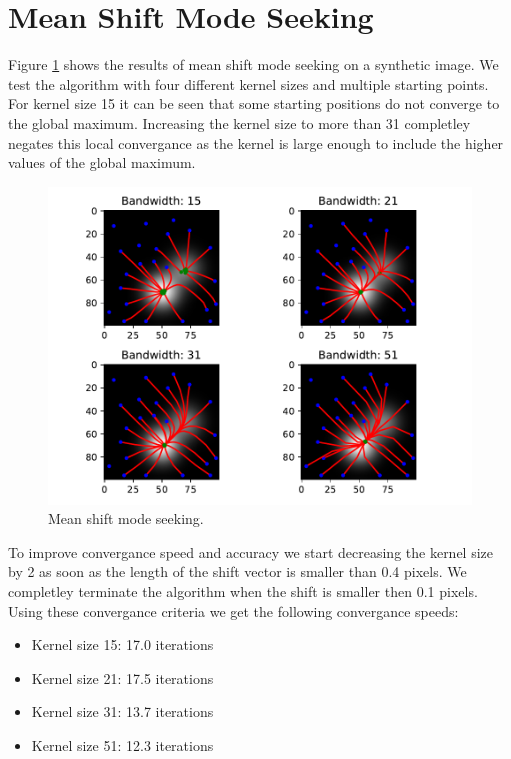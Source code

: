 \documentclass[9pt]{IEEEtran}
\begin{document}
\section{Mean Shift Mode Seeking}
Figure \ref{fig:mean_shift} shows the results of mean shift mode seeking on a synthetic image.
We test the algorithm with four different kernel sizes and multiple starting points.
For kernel size 15 it can be seen that some starting positions do not converge to the global maximum.
Increasing the kernel size to more than 31 completley negates this local convergance as the kernel is large enough to include the higher values of the global maximum.
\begin{figure}[h]
    \centering
    \includegraphics[width=1\columnwidth]{mean_shift.pdf}
    \caption{Mean shift mode seeking.}
    \label{fig:mean_shift}
\end{figure}
To improve convergance speed and accuracy we start decreasing the kernel size by 2 as soon as the length of the shift vector is smaller than 0.4 pixels.
We completley terminate the algorithm when the shift is smaller then 0.1 pixels.
Using these convergance criteria we get the following convergance speeds:
\begin{itemize}
    \item Kernel size 15: 17.0 iterations
    \item Kernel size 21: 17.5 iterations
    \item Kernel size 31: 13.7 iterations
    \item Kernel size 51: 12.3 iterations
\end{itemize}
\end{document}
